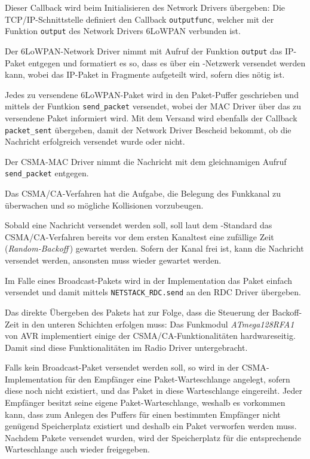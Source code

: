 	Dieser Callback wird beim Initialisieren des Network Drivers übergeben:
	Die TCP/IP-Schnittstelle definiert den Callback \lstinline=outputfunc=,
	welcher mit der Funktion \lstinline=output= des Network Drivers
	\acs{6LoWPAN} verbunden ist.

	Der \acs{6LoWPAN}-Network Driver nimmt mit Aufruf der Funktion
	\lstinline=output= das IP-Paket entgegen und formatiert es so, dass es über
	ein \ieeeframe-Netzwerk versendet werden kann, wobei das IP-Paket in
	Fragmente aufgeteilt wird, sofern dies nötig ist.

	Jedes zu versendene \acs{6LoWPAN}-Paket wird in den Paket-Puffer
	geschrieben und mittels der Funtkion \lstinline=send_packet= versendet,
	wobei der MAC Driver über das zu versendene Paket informiert wird.  Mit
	dem Versand wird ebenfalls der Callback \lstinline=packet_sent= übergeben,
	damit der Network Driver Bescheid bekommt, ob die Nachricht erfolgreich
	versendet wurde oder nicht.

	Der \acs{CSMA}-MAC Driver nimmt die Nachricht mit dem gleichnamigen
	Aufruf \lstinline=send_packet= entgegen.

	Das \acs{CSMA/CA}-Verfahren hat die Aufgabe, die Belegung des Funkkanal
	zu überwachen und so mögliche Kollisionen vorzubeugen.

	Sobald eine Nachricht versendet werden soll, soll laut dem
	\ieeeframe-Standard das \acs{CSMA/CA}-Verfahren bereits vor dem ersten
	Kanaltest eine zufällige Zeit (\emph{Random-Backoff}\,)
	gewartet werden.  Sofern der Kanal frei ist,
	kann die Nachricht versendet werden, ansonsten muss wieder gewartet
	werden.

	Im Falle eines Broadcast-Pakets wird in der Implementation das Paket
	einfach versendet und damit mittels \lstinline=NETSTACK_RDC.send= an den
	RDC Driver übergeben.

	Das direkte Übergeben des Pakets hat zur Folge, dass die Steuerung der
	Backoff-Zeit in den unteren Schichten erfolgen muss: Das Funkmodul
	\emph{ATmega128RFA1} von AVR implementiert einige der
	\acs{CSMA/CA}-Funktionalitäten hardwareseitig. Damit sind diese
	Funktionalitäten im Radio Driver untergebracht.

	Falls kein Broadcast-Paket versendet werden soll, so wird in der
	\acs{CSMA}-Implementation für den Empfänger eine Paket-Warteschlange
	angelegt, sofern diese noch nicht existiert, und das Paket in diese
	Warteschlange eingereiht. Jeder Empfänger besitzt seine eigene
	Paket-Warteschlange, weshalb es vorkommen kann, dass zum Anlegen des
	Puffers für einen bestimmten Empfänger nicht genügend Speicherplatz
	existiert und deshalb ein Paket verworfen werden muss. Nachdem Pakete
	versendet wurden, wird der Speicherplatz für die entsprechende
	Warteschlange auch wieder freigegeben.

